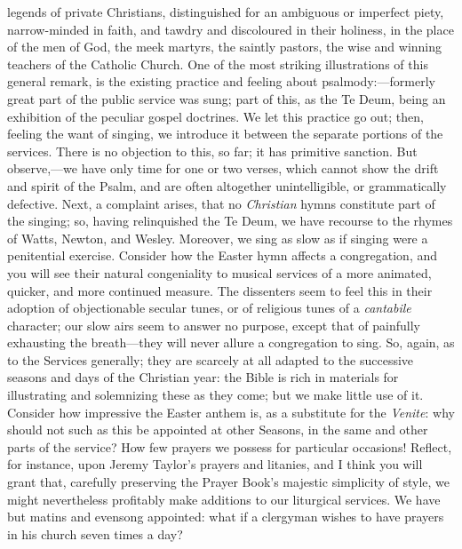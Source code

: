 legends of private Christians, distinguished for an ambiguous or
imperfect piety, narrow-minded in faith, and tawdry and discoloured in
their holiness, in the place of the men of God, the meek martyrs, the
saintly pastors, the wise and winning teachers of the Catholic Church.
One of the most striking illustrations of this general remark, is the
existing practice and feeling about psalmody:—formerly great part of
the public service was sung; part of this, as the Te Deum, being an
exhibition of the peculiar gospel doctrines. We let this practice go
out; then, feeling the want of singing, we introduce it between the
separate portions of the services. There is no objection to this, so
far; it has primitive sanction. But observe,—we have only time for
one or two verses, which cannot show the drift and spirit of the
Psalm, and are often altogether unintelligible, or grammatically
defective. Next, a complaint arises, that no \emph{Christian} hymns
constitute part of the singing; so, having relinquished the Te Deum,
we have recourse to the rhymes of Watts, Newton, and Wesley. Moreover,
we sing as slow as if singing were a penitential exercise. Consider
how the Easter hymn affects a congregation, and you will see their
natural congeniality to musical services of a more animated, quicker,
and more continued measure. The dissenters seem to feel this in their
adoption of objectionable secular tunes, or of religious tunes of a \emph{cantabile}
character; our slow airs seem to answer no purpose, except that of
painfully exhausting the breath—they will never allure a
congregation to sing. So, again, as to the Services generally; they
are scarcely at all adapted to the successive seasons and days of the
Christian year: the Bible is rich in materials for illustrating and solemnizing these as they come; but we make little use of it.
Consider how impressive the Easter anthem is, as a substitute for the \emph{Venite}:
why should not such as this be appointed at other Seasons, in the same
and other parts of the service? How few prayers we possess for
particular occasions! Reflect, for instance, upon Jeremy Taylor's
prayers and litanies, and I think you will grant that, carefully
preserving the Prayer Book's majestic simplicity of style, we might
nevertheless profitably make additions to our liturgical services. We
have but matins and evensong appointed: what if a clergyman wishes to
have prayers in his church seven times a day?

